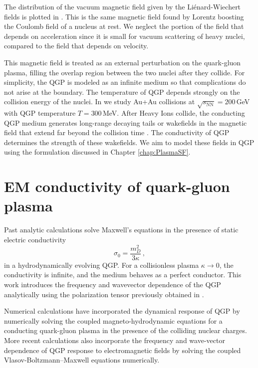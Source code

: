 The distribution of the vacuum magnetic field given by the Li\'enard-Wiechert fields is plotted in . This is the same magnetic field found by Lorentz boosting the Coulomb field of a nucleus at rest. We neglect the portion of the field that depends on acceleration since it is small for vacuum scattering of heavy nuclei, compared to the field that depends on velocity.

This magnetic field is treated as an external perturbation on the quark-gluon plasma, filling the overlap region between the two nuclei after they collide. For simplicity, the QGP is modeled as an infinite medium so that complications do not arise at the boundary. The temperature of QGP depends strongly on the collision energy of the nuclei. In \cite{Grayson:2022asf} we study Au+Au collisions at $\sqrt{s_{\text{NN}}}=200\,$GeV with QGP temperature $T=300$\,MeV.  After Heavy Ions collide, the conducting QGP medium generates long-range decaying tails or wakefields in the magnetic field that extend far beyond the collision time \cite{Tuchin:2010vs}. The conductivity of QGP determines the strength of these wakefields. We aim to model these fields in QGP using the formulation discussed in Chapter \ref{chap:PlasmaSF}.

\section{EM conductivity of quark-gluon plasma}

Past analytic calculations \cite{Tuchin:2010vs,Deng:2012pc,McLerran:2013hla,Tuchin:2013apa,Gursoy:2014aka,Li:2016tel,Roy:2015kma} solve Maxwell's equations in the presence of static electric conductivity 
\begin{equation}
   \sigma_0 = \frac{m_D^2}{3\kappa}\,,
\end{equation} 
in a  hydrodynamically evolving QGP. For a collisionless plasma $\kappa\rightarrow0$, the conductivity is infinite, and the medium behaves as a perfect conductor. This work introduces the frequency and wavevector dependence of the QGP analytically using the polarization tensor previously obtained in \cite{Formanek:2021blc}.

Numerical calculations \cite{Inghirami:2016iru,Inghirami:2019mkc} have incorporated the dynamical response of QGP by numerically solving the coupled magneto-hydrodynamic equations for a conducting quark-gluon plasma in the presence of the colliding nuclear charges. More recent calculations \cite{Yan:2021zjc,Wang:2021oqq} also incorporate the frequency and wave-vector dependence of QGP response to electromagnetic fields by solving the coupled Vlasov-Boltzmann--Maxwell equations numerically.



